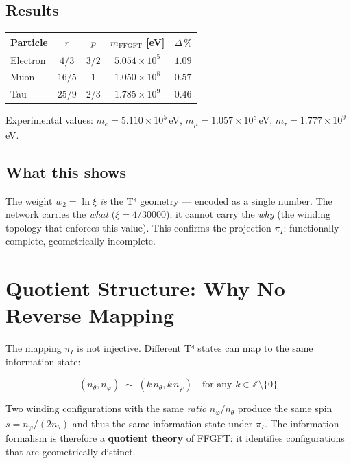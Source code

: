 \subsection{Results}

\begin{center}
\renewcommand{\arraystretch}{1.3}
{\small
\begin{tabular}{lcccc}
\toprule
\textbf{Particle} & $r$ & $p$
  & $m_\text{FFGFT}$ [eV] & $\Delta\,\%$ \\
\midrule
Electron & $4/3$ & $3/2$ & $5.054\times10^5$ & $1.09$ \\
Muon     & $16/5$ & $1$   & $1.050\times10^8$ & $0.57$ \\
Tau      & $25/9$ & $2/3$ & $1.785\times10^9$ & $0.46$ \\
\bottomrule
\end{tabular}
}
\end{center}

Experimental values: $m_e = 5.110\times10^5$\,eV,
$m_\mu = 1.057\times10^8$\,eV, $m_\tau = 1.777\times10^9$\,eV.

\subsection{What this shows}

The weight $w_2 = \ln\xi$ \emph{is} the T⁴ geometry --- encoded as
a single number. The network carries the \emph{what} ($\xi = 4/30000$);
it cannot carry the \emph{why} (the winding topology that enforces this
value). This confirms the projection $\pi_I$: functionally complete,
geometrically incomplete.

\section{Quotient Structure: Why No Reverse Mapping}

The mapping $\pi_I$ is not injective. Different T⁴ states can map to
the same information state:

\begin{equation}
  (n_\theta, n_\varphi) \;\sim\; (k\,n_\theta, k\,n_\varphi)
  \quad\text{for any } k \in \mathbb{Z}\setminus\{0\}
  \tag{243.10}
\end{equation}

Two winding configurations with the same \emph{ratio}
$n_\varphi/n_\theta$ produce the same spin $s = n_\varphi/(2n_\theta)$
and thus the same information state under $\pi_I$.
The information formalism is therefore a \textbf{quotient theory}
of FFGFT: it identifies configurations that are geometrically distinct.

